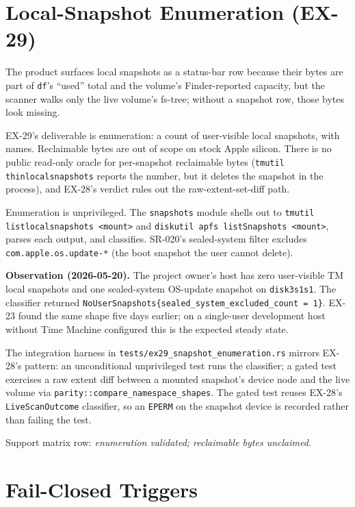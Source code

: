 \section{Local-Snapshot Enumeration (EX-29)}
\label{sec:ex29-snapshots}

The product surfaces local snapshots as a status-bar row because
their bytes are part of \texttt{df}'s ``used'' total and the
volume's Finder-reported capacity, but the scanner walks only the
live volume's fs-tree; without a snapshot row, those bytes look
missing.

EX-29's deliverable is enumeration: a count of user-visible local
snapshots, with names. Reclaimable bytes are out of scope on stock
Apple silicon. There is no public read-only oracle for per-snapshot
reclaimable bytes (\texttt{tmutil thinlocalsnapshots} reports the
number, but it deletes the snapshot in the process), and EX-28's
verdict rules out the raw-extent-set-diff path.

Enumeration is unprivileged. The \texttt{snapshots} module shells
out to \texttt{tmutil listlocalsnapshots <mount>} and
\texttt{diskutil apfs listSnapshots <mount>}, parses each output,
and classifies. SR-020's sealed-system filter excludes
\texttt{com.apple.os.update-*} (the boot snapshot the user cannot
delete).

\textbf{Observation (2026-05-20).} The project owner's host has
zero user-visible TM local snapshots and one sealed-system
OS-update snapshot on \texttt{disk3s1s1}. The classifier returned
\texttt{NoUserSnapshots\{sealed\_system\_excluded\_count = 1\}}.
EX-23 found the same shape five days earlier; on a single-user
development host without Time Machine configured this is the
expected steady state.

The integration harness in
\texttt{tests/ex29\_snapshot\_enumeration.rs} mirrors EX-28's
pattern: an unconditional unprivileged test runs the classifier;
a gated test exercises a raw extent diff between a mounted
snapshot's device node and the live volume via
\texttt{parity::compare\_namespace\_shapes}. The gated test reuses
EX-28's \texttt{LiveScanOutcome} classifier, so an \texttt{EPERM}
on the snapshot device is recorded rather than failing the test.

Support matrix row: \emph{enumeration validated; reclaimable bytes
unclaimed.}

\section{Fail-Closed Triggers}

